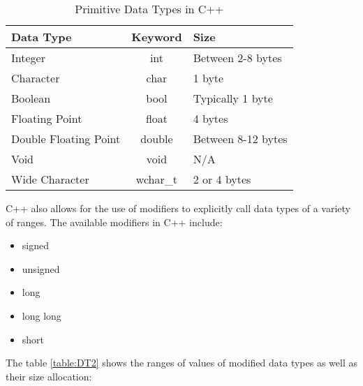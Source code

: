 \documentclass[12pt]{article}
\begin{document}
\begin{table}[h!]
  \begin{center}
    \caption{Primitive Data Types in C++}
    \label{table:DT1}
    \begin{tabular}{|l|c|l|}
      \toprule %
      \textbf{Data Type} & \textbf{Keyword} & \textbf{Size}\\
      \midrule %
      Integer & int & Between 2-8 bytes \\ 
      \hline
      Character & char & 1 byte \\
      \hline
      Boolean & bool & Typically 1 byte \\
      \hline
      Floating Point & float & 4 bytes \\
      \hline
      Double Floating Point & double & Between 8-12 bytes \\
      \hline
      Void & void & N/A \\
      \hline
      Wide Character & wchar\_t & 2 or 4 bytes\\ 
      \bottomrule
    \end{tabular}
  \end{center}
\end{table}

C++ also allows for the use of modifiers to explicitly call data types of a variety of ranges.
The available modifiers in C++ include:
\begin{itemize}
  \item signed
  \item unsigned
  \item long
  \item long long
  \item short
\end{itemize}

The table \ref{table:DT2} shows the ranges of values of modified data types as well as their size allocation:
\end{document}
